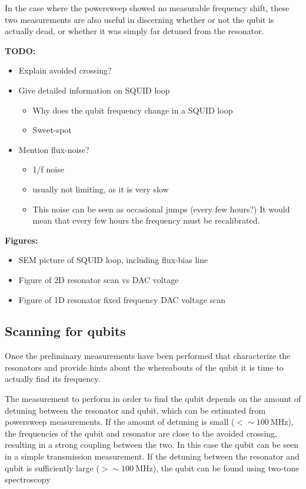\documentclass[12pt]{report}
\begin{document}
        In the case where the powersweep showed no measurable frequency shift, these two measurements are also useful in discerning whether or not the qubit is actually dead, or whether it was simply far detuned from the resonator.


        \textbf{TODO:}
        \begin{itemize}
          \item Explain avoided crossing?
          \item Give detailed information on SQUID loop
          \begin{itemize}
            \item Why does the qubit frequency change in a SQUID loop
            \item Sweet-spot
          \end{itemize}
          \item Mention flux-noise?
          \begin{itemize}
            \item 1/f noise
            \item usually not limiting, as it is very slow
            \item This noise can be seen as occasional jumps (every few hours?) It would mean that every few hours the frequency must be recalibrated.
          \end{itemize}
        \end{itemize}

        \textbf{Figures:}
        \begin{itemize}
          \item SEM picture of SQUID loop, including flux-bias line
          \item Figure of 2D resonator scan vs DAC voltage
          \item Figure of 1D resonator fixed frequency DAC voltage scan
        \end{itemize}

      \subsection{Scanning for qubits}
        Once the preliminary measurements have been performed that characterize the resonators and provide hints about the whereabouts of the qubit it is time to actually find its frequency.

        The measurement to perform in order to find the qubit depends on the amount of detuning between the resonator and qubit, which can be estimated from powersweep measurements. If the amount of detuning is small ($ < \sim \SI{100}{\mega \hertz}$), the frequencies of the qubit and resonator are close to the avoided crossing, resulting in a strong coupling between the two. In this case the qubit can be seen in a simple transmission measurement. If the detuning between the resonator and qubit is sufficiently large ($> \sim \SI{100}{\mega \hertz}$), the qubit can be found using two-tone spectroscopy
\end{document}

